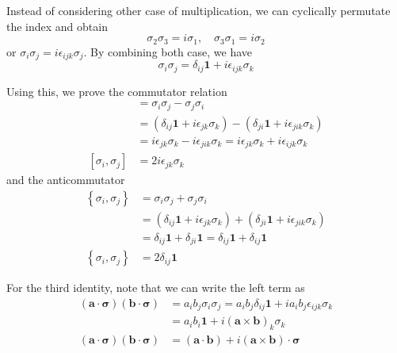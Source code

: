 \documentclass[../../../main.tex]{subfiles}
\begin{document}
Instead of considering other case of multiplication, we can cyclically permutate the index and obtain
\begin{equation*}
    \sigma_2 \sigma_3 = i \sigma_1, \quad \sigma_3 \sigma_1 = i \sigma_2
\end{equation*}
or $\sigma_{i}\sigma_j=i\epsilon_{ijk}\sigma_j$.
By combining both case, we have
\begin{equation*}
    \sigma_i \sigma_j = \delta_{ij} \mathbf{1} + i \epsilon_{ijk} \sigma_k
\end{equation*}

Using this, we prove the commutator relation
\begin{align*}
    [\sigma_i,\sigma_j]
     & =   \sigma_i \sigma_j - \sigma_j \sigma_i                                                                    \\
     & = (\delta_{ij} \mathbf{1} + i \epsilon_{jk} \sigma_k) - (\delta_{ji} \mathbf{1} + i \epsilon_{jik} \sigma_k) \\
     & =i \epsilon_{jk} \sigma_k - i \epsilon_{jik} \sigma_k = i \epsilon_{jk} \sigma_k + i \epsilon_{ijk} \sigma_k \\
    [\sigma_i,\sigma_j]
     & = 2i \epsilon_{jk} \sigma_k
\end{align*}
and the anticommutator
\begin{align*}
    \left\{ \sigma_i,\sigma_j \right\}
     & =   \sigma_i \sigma_j + \sigma_j \sigma_i                                                                    \\
     & = (\delta_{ij} \mathbf{1} + i \epsilon_{jk} \sigma_k) + (\delta_{ji} \mathbf{1} + i \epsilon_{jik} \sigma_k) \\
     & =\delta_{ij} \mathbf{1} + \delta_{ji} \mathbf{1} = \delta_{ij} \mathbf{1} + \delta_{ij} \mathbf{1}           \\
    \left\{ \sigma_i,\sigma_j \right\}
     & = 2 \delta_{ij} \mathbf{1}
\end{align*}

For the third identity, note that we can write the left term as
\begin{align*}
    (\mathbf{a} \cdot \boldsymbol{\sigma})(\mathbf{b} \cdot \boldsymbol{\sigma})
     & =  a_i b_j \sigma_i \sigma_j =     a_i b_j\delta_{ij} \mathbf{1} + ia_i b_j \epsilon_{ijk} \sigma_k \\
     & =  a_i b_i \mathbf{1} + i (\mathbf{a }\times \mathbf{b })_k \sigma_k                                \\
    (\mathbf{a} \cdot \boldsymbol{\sigma})(\mathbf{b} \cdot \boldsymbol{\sigma})
     & = (\mathbf{a }\cdot \mathbf{b }) + i (\mathbf{a }\times \mathbf{b } )\cdot \boldsymbol{\sigma}
\end{align*}
\end{document}
